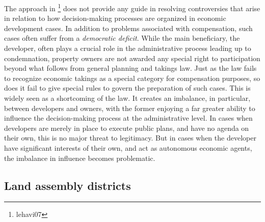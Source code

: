 {The approach in \footnote{lehavi07} does not provide any guide in resolving controversies that arise in relation to how decision-making processes are organized in economic development cases. In addition to problems associated with compensation, such cases often suffer from a {\it democratic deficit}. While the main beneficiary, the developer, often plays a crucial role in the administrative process leading up to condemnation, property owners are not awarded any special right to participation beyond what follows from general planning and takings law. Just as the law fails to recognize economic takings as a special category for compensation purposes, so does it fail to give special rules to govern the preparation of such cases. This is widely seen as a shortcoming of the law. It creates an imbalance, in particular, between developers and owners, with the former enjoying a far greater ability to influence the decision-making process at the administrative level. In cases when developers are merely in place to execute public plans, and have no agenda on their own, this is no major threat to legitimacy. But in cases when the developer have significant interests of their own, and act as autonomous economic agents, the imbalance in influence becomes problematic.}

\subsection{Land assembly districts}


